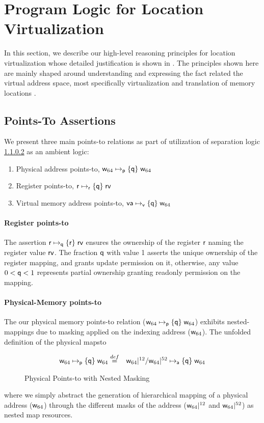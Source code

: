 \section{Program Logic for Location Virtualization}
\label{sec:logic}
In this section, we describe our high-level reasoning principles for location virtualization whose detailed justification is shown in . The principles shown here are mainly shaped around understanding and expressing the fact related the virtual address space, most specifically virtualization and translation of memory locations .
\subsection{Points-To Assertions}
\label{sec:pointsto}

We present three main points-to relations as part of utilization of separation logic \ref{} as an ambient logic:
\begin{enumerate}
\item Physical address points-to, $\mathsf{w}_{64}\mapsto_{\mathsf{p}}\{\mathsf{q}\}\;\mathsf{w}_{64}$
\item Register points-to, $\mathsf{r}\mapsto_{\mathsf{r}}\{\mathsf{q}\}\;\mathsf{rv}$
\item Virtual memory address points-to, $\mathsf{va}\mapsto_{\mathsf{v}}\{\mathsf{q}\}\;\mathsf{w}_{64}$
\end{enumerate}
\paragraph{Register points-to} The assertion $\mathsf{r}\mapsto_{\mathsf{q}}\{\mathsf{r}\}\;\mathsf{rv}$ ensures the ownership of the register $\mathsf{r}$ naming the register value $\mathsf{rv}$. The fraction $\mathsf{q}$ with value 1 asserts the unique ownership of the register mapping, and grants update permission on it, otherwise, any value $0 < \mathsf{q} <1$ represents partial ownership granting readonly permission on the mapping.
\paragraph{Physical-Memory points-to} The our physical memory points-to relation ($\mathsf{w}_{64}\mapsto_{\mathsf{p}}\{\mathsf{q}\}\;\mathsf{w}_{64}$) exhibits nested-mappings due to masking applied on the indexing address ($\mathsf{w}_{64}$). The unfolded definition of the physical mapsto 
\begin{figure}[!ht]
\[
\begin{array}{cl}
\mathsf{w}_{64}\mapsto_{\mathsf{p}}\{\mathsf{q}\}\;\mathsf{w}_{64} \stackrel{def}{=} & \mathsf{w}_{64}|^{12} / \mathsf{w}_{64}|^{52} \mapsto_{\mathsf{a}}\{\mathsf{q}\}\;\mathsf{w}_{64}
\end{array}
\]
\caption{Physical Points-to with Nested Masking}
  \label{fig:physicalpointsto}
\end{figure}
where we simply abstract the generation of hierarchical mapping of a physical address ($\mathsf{w}_{64}$) through the different masks of the address ($\mathsf{w}_{64}|^{12}$ and $\mathsf{w}_{64}|^{52}$) as nested map resources.
